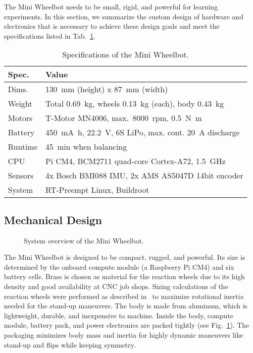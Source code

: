 The Mini Wheelbot needs to be small, rigid, and powerful for learning experiments.
In this section, we summarize the custom design of hardware and electronics that is necessary to achieve these design goals and meet the specifications listed in Tab.~\ref{tab:robot_specs}.
\begin{table}[hbt]
    \caption{Specifications of the Mini Wheelbot.}
    \centering
    \begin{tabular}{|l|l|}
    \hline
    \textbf{Spec.} & \textbf{Value} \\
    \hline
    \hline
    Dims. & \SI{130}{\milli\meter} (height) x \SI{87}{\milli\meter} (width) \\
    \hline
    Weight & Total \SI{0.69}{\kilo\gram}, wheels \SI{0.13}{\kilo\gram} (each), body \SI{0.43}{\kilo\gram} \\
    \hline
    Motors & T-Motor MN4006, max.~\num{8000}~rpm, \SI{0.5}{\newton\meter} \\
    \hline
    Battery & \SI{450}{\milli\ampere\hour}, \SI{22.2}{\volt}, 6S LiPo, max. cont. \SI{20}{\ampere} discharge  \\
    \hline
    Runtime & \SI{45}{\minute} when balancing\\
    \hline
    CPU & Pi CM4, BCM2711 quad-core Cortex-A72, \SI{1.5}{\giga\hertz} \\
    \hline
    Sensors & 4x Bosch BMI088 IMU, 2x AMS AS5047D 14bit encoder\\
    \hline
    System & RT-Preempt Linux, Buildroot \\
    \hline
    \end{tabular}
    \label{tab:robot_specs}
\end{table}

\subsection{Mechanical Design}

\begin{figure}[tb]
    \centering
    
    \caption{System overview of the Mini Wheelbot.}
    \label{fig:packaging}
\end{figure}

The Mini Wheelbot is designed to be compact, rugged, and powerful.
Its size is determined by the onboard compute module (a Raspberry Pi CM4) and six battery cells.
Brass is chosen as material for the reaction wheels due to its high density and good availability at CNC job shops.
Sizing calculations of the reaction wheels were performed as described in~\cite{geist2022wheelbot} to maximize rotational inertia needed for the stand-up maneuvers.
The body is made from aluminum, which is lightweight, durable, and inexpensive to machine.
Inside the body, compute module, battery pack, and power electronics are packed tightly (see Fig.~\ref{fig:packaging}).
The packaging minimizes body mass and inertia for highly dynamic maneuvers like stand-up and flips while keeping symmetry.


